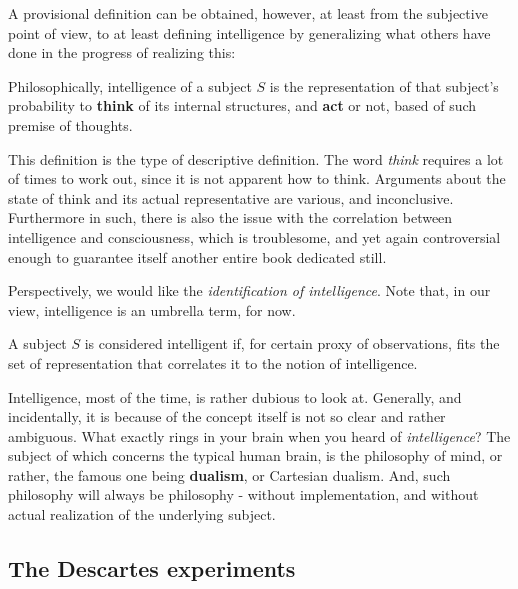 A provisional definition can be obtained, however, at least from the subjective point of view, to at least defining intelligence by generalizing what others have done in the progress of realizing this: 

\begin{definition}[Intelligence]\label{def:intel1}
    Philosophically, intelligence of a subject $S$ is the representation of that subject's probability to \textbf{think} of its internal structures, and \textbf{act} or not, based of such premise of thoughts.
\end{definition}

This definition is the type of descriptive definition. The word \textit{think} requires a lot of times to work out, since it is not apparent how to think. Arguments about the state of think and its actual representative are various, and inconclusive. Furthermore in such, there is also the issue with the correlation between intelligence and consciousness, which is troublesome, and yet again controversial enough to guarantee itself another entire book dedicated still. 

Perspectively, we would like the \textit{identification of intelligence}. Note that, in our view, intelligence is an umbrella term, for now. 

\begin{definition}[Intelligent]
    A subject $S$ is considered intelligent if, for certain proxy of observations, fits the set of representation that correlates it to the notion of intelligence. 
\end{definition}

Intelligence, most of the time, is rather dubious to look at. Generally, and incidentally, it is because of the concept itself is not so clear and rather ambiguous. What exactly rings in your brain when you heard of \textit{intelligence}? The subject of which concerns the typical human brain, is the philosophy of mind, or rather, the famous one being \textbf{dualism}, or Cartesian dualism. And, such philosophy will always be philosophy - without implementation, and without actual realization of the underlying subject. 

\subsection{The Descartes experiments}

